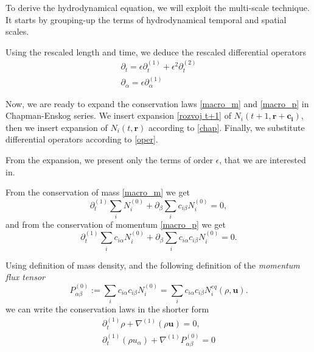 To derive the hydrodynamical equation, we will exploit the multi-scale technique. It starts by grouping-up the terms of hydrodynamical temporal and spatial scales.


\bigskip
Using the rescaled length and time, we deduce the rescaled differential operators
\begin{equation} \label{oper}
\begin{split}
\partial_t = \epsilon \partial_t^{(1)} + \epsilon^2 \partial_t^{(2)} \\
\partial_{\alpha} = \epsilon \partial_{\alpha}^{(1)}
\end{split}
\end{equation}

Now, we are ready to expand the conservation laws \ref{macro_m} and \ref{macro_p} in Chapman-Enskog series. We insert expansion \ref{rozvoj t+1} of $N_i(t+1,\bm{r}+\bm{c_i})$, then we insert expansion of $N_i(t,\bm{r})$ according to \ref{chap}. Finally, we substitute differential operators according to \ref{oper}.

From the expansion, we present only the terms of order $\epsilon$, that we are interested in.

From the conservation of mass \ref{macro_m} we get
\begin{equation}
\partial_t^{(1)} \sum_i N_i^{(0)} + \partial_{\beta} \sum_i c_{i\beta} N_i^{(0)} = 0,
\end{equation}
and from the conservation of momentum \ref{macro_p} we get
\begin{equation}
\partial_t^{(1)} \sum_i c_{i\alpha} N_i^{(0)} + \partial_{\beta} \sum_i c_{i\alpha} c_{i\beta} N_i^{(0)} = 0.
\end{equation}

Using definition of mass density, and the following definition of the \textit{momentum flux tensor}
\begin{equation}
P^{(0)}_{\alpha\beta} := \sum_i c_{i\alpha} c_{i\beta} N_i^{(0)} = \sum_i c_{i\alpha} c_{i\beta} N_i^{eq}(\rho, \bm{u}).
\end{equation}
we can write the conservation laws in the shorter form
\begin{equation} 
\begin{split}
\partial_t^{(1)} \rho + \nabla^{(1)}(\rho \bm{u}) = 0, \\ 
\partial_t^{(1)} (\rho u_{\alpha}) + \nabla^{(1)} P^{(0)}_{\alpha\beta} = 0 \label{eul_primitive}
\end{split}
\end{equation}

